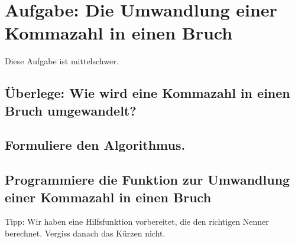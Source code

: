 \section{Aufgabe: Die Umwandlung einer Kommazahl in einen Bruch}

Diese Aufgabe ist mittelschwer.

\subsection*{Überlege: Wie wird eine Kommazahl in einen Bruch umgewandelt?}

\subsection*{Formuliere den Algorithmus.}

\subsection*{Programmiere die Funktion zur Umwandlung einer Kommazahl in einen Bruch}

Tipp: Wir haben eine Hilfsfunktion vorbereitet, die den richtigen Nenner berechnet. Vergiss danach das Kürzen nicht.